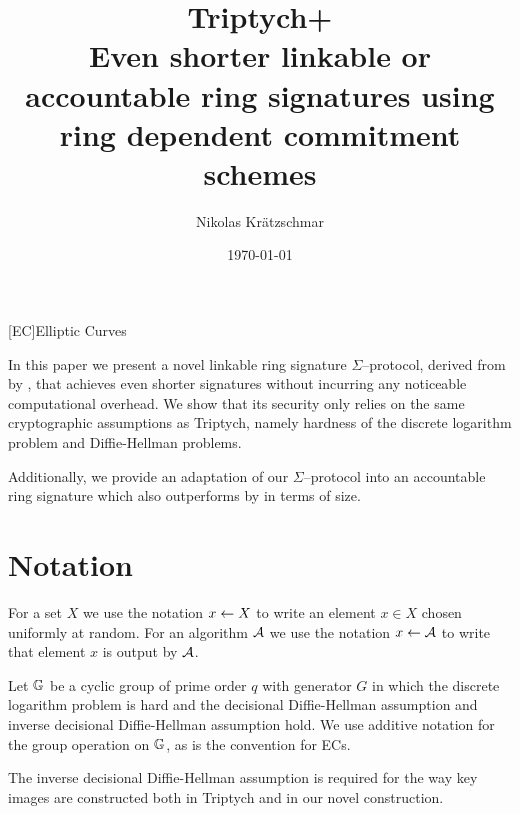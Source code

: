 

\title{\textbf{Triptych+}\\Even shorter linkable or accountable ring signatures using ring dependent commitment schemes}
\author{Nikolas Krätzschmar}
\date{\today}



[EC]{Elliptic Curves}

\maketitle

In this paper we present a novel linkable ring signature $\Sigma$--protocol, derived from  \cite{triptych} by \citeauthor{triptych}, that achieves even shorter signatures without incurring any noticeable computational overhead.
We show that its security only relies on the same cryptographic assumptions as Triptych, namely hardness of the discrete logarithm problem and Diffie-Hellman problems.

Additionally, we provide an adaptation of our $\Sigma$--protocol into an accountable ring signature which also outperforms  \cite{short_ring_signatures} by \citeauthor{short_ring_signatures} in terms of size.

\section{Notation}
\label{notation}

\begin{definition}
	For a set $X$ we use the notation $x \leftarrow X$ to write an element $x \in X$ chosen uniformly at random.
	For an algorithm $\mathcal A$ we use the notation $x \leftarrow \mathcal A$ to write that element $x$ is output by $\mathcal A$.
\end{definition}

\begin{definition}
	Let $\mathbb G$ be a cyclic group of prime order $q$ with generator $G$ in which the discrete logarithm problem is hard and the decisional Diffie-Hellman assumption and inverse decisional Diffie-Hellman assumption \cite{dh_vars} hold.
	We use additive notation for the group operation on $\mathbb G$, as is the convention for \acp{EC}.

	\NB The inverse decisional Diffie-Hellman assumption is required for the way key images are constructed both in Triptych and in our novel construction.
\end{definition}

